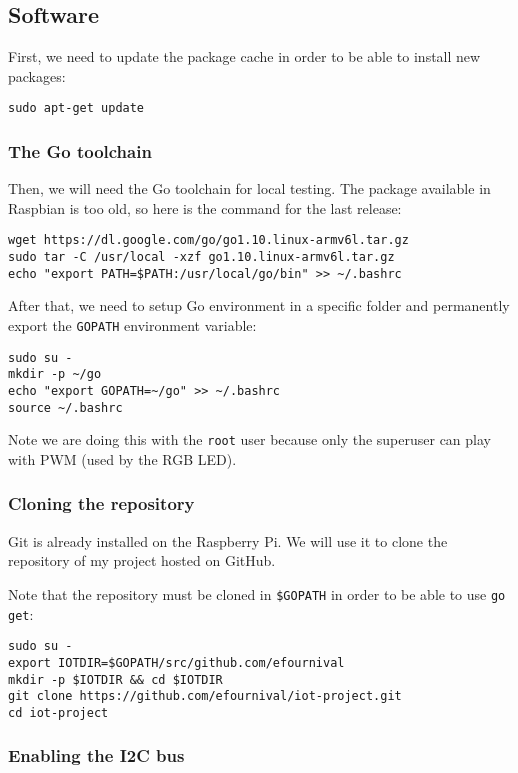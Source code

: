 \documentclass[11pt,a4paper]{article}
\newcommand{\rpi}{Raspberry Pi\xspace}
\begin{document}
\subsection{Software}

First, we need to update the package cache in order to be able to install new packages:
\begin{verbatim}
sudo apt-get update
\end{verbatim}

\subsubsection{The Go toolchain}

Then, we will need the Go toolchain for local testing. The package available in Raspbian is too old, so here is the command for the last release:
\begin{verbatim}
wget https://dl.google.com/go/go1.10.linux-armv6l.tar.gz
sudo tar -C /usr/local -xzf go1.10.linux-armv6l.tar.gz
echo "export PATH=$PATH:/usr/local/go/bin" >> ~/.bashrc
\end{verbatim}

After that, we need to setup Go environment in a specific folder and permanently export the \texttt{GOPATH} environment variable:
\begin{verbatim}
sudo su -
mkdir -p ~/go
echo "export GOPATH=~/go" >> ~/.bashrc
source ~/.bashrc
\end{verbatim}

Note we are doing this with the \texttt{root} user because only the superuser can play with PWM (used by the RGB LED).

\subsubsection{Cloning the repository}

Git is already installed on the \rpi. We will use it to clone the repository of my project hosted on GitHub.

Note that the repository must be cloned in \verb|$GOPATH| in order to be able to use \texttt{go get}:
\begin{verbatim}
sudo su -
export IOTDIR=$GOPATH/src/github.com/efournival
mkdir -p $IOTDIR && cd $IOTDIR
git clone https://github.com/efournival/iot-project.git
cd iot-project
\end{verbatim}

\subsubsection{Enabling the I2C bus}
\end{document}
